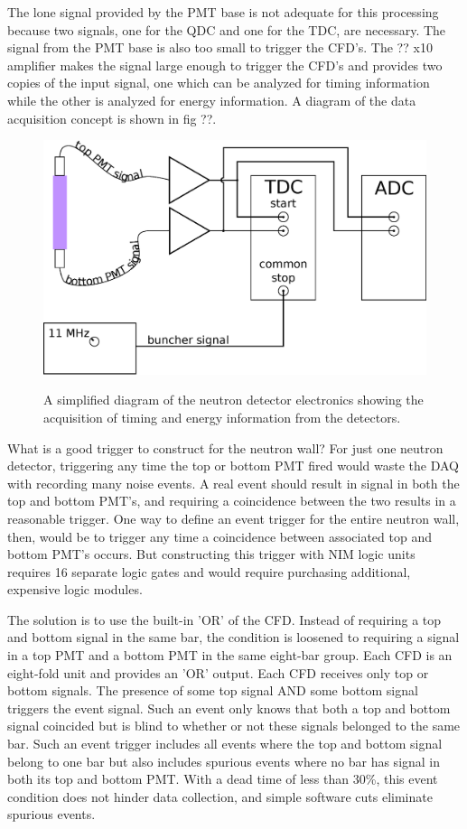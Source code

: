 The lone signal provided by the PMT base is not adequate for this processing because two signals, one for the QDC and one for the TDC, are necessary.  The signal from the PMT base is also too small to trigger the CFD's.  The ?? x10 amplifier makes the signal large enough to trigger the CFD's and provides two copies of the input signal, one which can be analyzed for timing information while the other is analyzed for energy information.  A diagram of the data acquisition concept is shown in fig ??.

\begin{figure}[htp]
\centering
\includegraphics[width=1.0\textwidth]{figures/basic_electronics.eps}
\label{fig:simpleElectronics}
\caption{A simplified diagram of the neutron detector electronics showing the acquisition of timing and energy information from the detectors.}
\end{figure}

What is a good trigger to construct for the neutron wall?  For just one neutron detector, triggering any time the top or bottom PMT fired would waste the DAQ with recording many noise events.  A real event should result in signal in both the top and bottom PMT's, and requiring a coincidence between the two results in a reasonable trigger.  One way to define an event trigger for the entire neutron wall, then, would be to trigger any time a coincidence between associated top and bottom PMT's occurs.  But constructing this trigger with NIM logic units requires 16 separate logic gates and would require purchasing additional, expensive logic modules.  

The solution is to use the built-in 'OR' of the CFD.  Instead of requiring a top and bottom signal in the same bar, the condition is loosened to requiring a signal in a top PMT and a bottom PMT in the same eight-bar group.  Each CFD is an eight-fold unit and provides an 'OR' output.  Each CFD receives only top or bottom signals.  The presence of some top signal AND some bottom signal triggers the event signal.  Such an event only knows that both a top and bottom signal coincided but is blind to whether or not these signals belonged to the same bar.  Such an event trigger includes all events where the top and bottom signal belong to one bar but also includes spurious events where no bar has signal in both its top and bottom PMT.  With a dead time of less than 30\%, this event condition does not hinder data collection, and simple software cuts eliminate spurious events.

